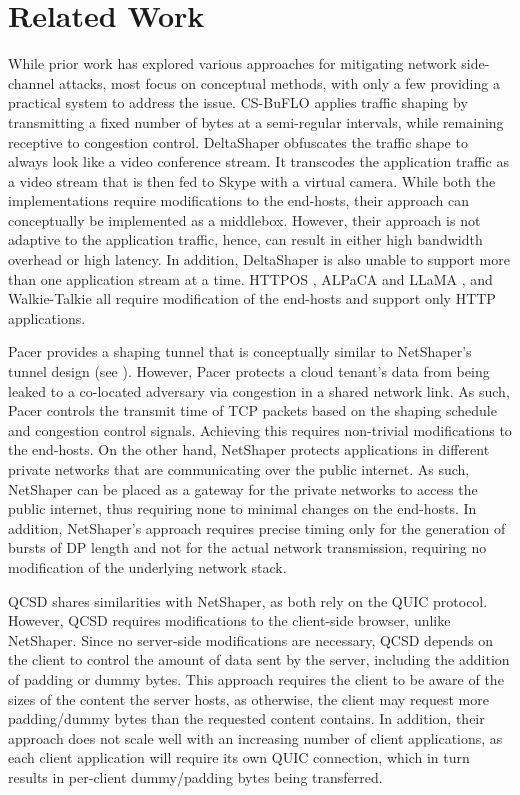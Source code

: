 \section{Related Work}
\label{sec:netshaper-related-work}

While prior work has explored various approaches for mitigating network side-channel attacks, most focus on conceptual methods, with only a few providing a practical system to address the issue.
CS-BuFLO \cite{cai2014csbuflo} applies traffic shaping by transmitting a fixed number of bytes at a semi-regular intervals, while remaining receptive to congestion control.
DeltaShaper \cite{barradas2017deltashaper} obfuscates the traffic shape to always look like a video conference stream.
It transcodes the application traffic as a video stream that is then fed to Skype with a virtual camera.
While both the implementations require modifications to the end-hosts, their approach can conceptually be implemented as a middlebox.
However, their approach is not adaptive to the application traffic, hence, can result in either high bandwidth overhead or high latency.
In addition, DeltaShaper is also unable to support more than one application stream at a time.
HTTPOS \cite{luo2011httpos}, ALPaCA and LLaMA \cite{cherubin2017llama}, and Walkie-Talkie \cite{wang2017walkie} all require modification of the end-hosts and support only HTTP applications.

Pacer \cite{mehta2022pacer} provides a shaping tunnel that is conceptually similar to NetShaper's tunnel design (see ).
However, Pacer protects a cloud tenant's data from being leaked to a co-located adversary via congestion in a shared network link.
As such, Pacer controls the transmit time of TCP packets based on the shaping schedule and congestion control signals.
Achieving this requires non-trivial modifications to the end-hosts.
On the other hand, NetShaper protects applications in different private networks that are communicating over the public internet. 
As such, NetShaper can be placed as a gateway for the private networks to access the public internet, thus requiring none to minimal changes on the end-hosts.
In addition, NetShaper's approach requires precise timing only for the generation of bursts of DP length and not for the actual network transmission, requiring no modification of the underlying network stack.

QCSD \cite{smith2022qcsd} shares similarities with NetShaper, as both rely on the QUIC protocol. 
However, QCSD requires modifications to the client-side browser, unlike NetShaper. 
Since no server-side modifications are necessary, QCSD depends on the client to control the amount of data sent by the server, including the addition of padding or dummy bytes.
This approach requires the client to be aware of the sizes of the content the server hosts, as otherwise, the client may request more padding/dummy bytes than the requested content contains.
In addition, their approach does not scale well with an increasing number of client applications, as each client application will require its own QUIC connection, which in turn results in per-client dummy/padding bytes being transferred.

